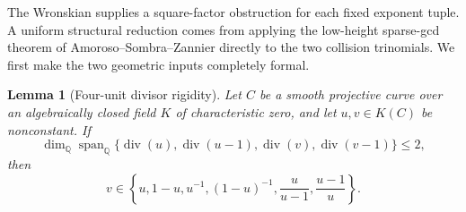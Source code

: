 \documentclass[11pt]{article}
\numberwithin{equation}{section}
\newtheorem{lemma}[theorem]{Lemma}
\theoremstyle{definition}
\newcommand{\Q}{\mathbb Q}
\begin{document}
The Wronskian supplies a square-factor obstruction for each fixed exponent
tuple.  A uniform structural reduction comes from applying the low-height
sparse-gcd theorem of Amoroso--Sombra--Zannier directly to the two collision
trinomials.  We first make the two geometric inputs completely formal.

\begin{lemma}[Four-unit divisor rigidity]\label{lem:fourunit}
Let \(C\) be a smooth projective curve over an algebraically closed field
\(K\) of characteristic zero, and let \(u,v\in K(C)\) be nonconstant.
If
\[
 \dim_{\Q}\operatorname{span}_{\Q}
 \{\operatorname{div}(u),\operatorname{div}(u-1),
   \operatorname{div}(v),\operatorname{div}(v-1)\}\leq2,
\]
then
\[
 v\in
 \left\{u,1-u,u^{-1},(1-u)^{-1},
          \frac{u}{u-1},\frac{u-1}{u}\right\}.
\]
\end{lemma}
\end{document}
